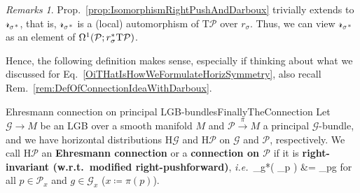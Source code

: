 \documentclass[a4paper,oneside,11pt,bibliography=totoc]{scrartcl}
\def\bas#1\eas{\begin{align*}#1\end{align*}}
\theoremstyle{plain}
\theoremstyle{remark}
\newtheorem{remark}[theorem]{Remarks}
\theoremstyle{definition}
\begin{document}
\begin{remark}\label{RSigmaAnAuto}
\leavevmode\newline
Prop.\ \ref{prop:IsomorphismRightPushAndDarboux} trivially extends to $\mathcal{r}_{\sigma*}$, that is, $\mathcal{r}_{\sigma*}$ is a (local) automorphism of $\mathrm{T}\mathcal{P}$ over $r_\sigma$. Thus, we can view $\mathcal{r}_{\sigma*}$ as an element of $\Omega^1\mleft(\mathcal{P}; r_\sigma^*\mathrm{T}\mathcal{P}\mright)$.
\end{remark}

Hence, the following definition makes sense, especially if thinking about what we discussed for Eq.\ \eqref{OiTHatIsHowWeFormulateHorizSymmetry}, also recall Rem.\ \ref{rem:DefOfConnectionIdeaWithDarboux}.

\begin{definitions}{Ehresmann connection on principal LGB-bundles}{FinallyTheConnection}
Let $\mathcal{G} \to M$ be an LGB over a smooth manifold $M$ and $\mathcal{P} \stackrel{\pi}{\to} M$ a principal $\mathcal{G}$-bundle, and we have horizontal distributions $\mathrm{H}\mathcal{G}$ and $\mathrm{H}\mathcal{P}$ on $\mathcal{G}$ and $\mathcal{P}$, respectively. We call $\mathrm{H}\mathcal{P}$ an \textbf{Ehresmann connection} or a \textbf{connection on $\mathcal{P}$} if it is \textbf{right-invariant (w.r.t.\ modified right-pushforward)}, \textit{i.e.}\
\bas
\mathcal{r}_{g*}\mleft( _p \mright)
&=
_{p\cdot g}
\eas
for all $p \in \mathcal{P}_x$ and $g \in \mathcal{G}_x$ ($x \coloneqq \pi(p)$).
\end{definitions}
\end{document}
